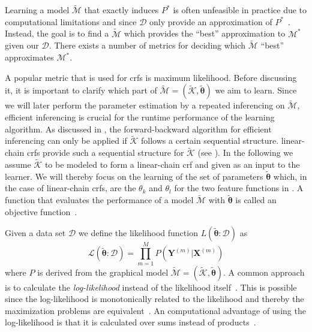 \bigskip

Learning a model $\mathcal{\tilde{M}}$ that exactly induces $P^*$ is often unfeasible in practice due to computational limitations and since $\mathcal{D}$ only provide an approximation of $P^*$~\citep{koller2009probabilistic}.
Instead, the goal is to find a $\mathcal{\tilde{M}}$ which provides the ``best'' approximation to $\mathcal{M}^*$ given our $\mathcal{D}$.
There exists a number of metrics for deciding which $\mathcal{\tilde{M}}$ ``best'' approximates $\mathcal{M}^*$.

A popular metric that is used for \glspl{crf} is \gls{maximum likelihood}.
Before discussing it, it is important to clarify which part of $\mathcal{\tilde{M}}=(\mathcal{\tilde{K}},\bm{\tilde{\theta}})$ we aim to learn.
Since we will later perform the parameter estimation by a repeated inferencing on $\mathcal{\tilde{M}}$, efficient inferencing is crucial for the runtime performance of the learning algorithm.
As discussed in , the forward-backward algorithm for efficient inferencing can only be applied if $\mathcal{\tilde{K}}$ follows a certain sequential structure.
\Glspl{linear-chain crf} provide such a sequential structure for $\mathcal{\tilde{K}}$ (see ).
In the following we assume $\mathcal{\tilde{K}}$ to be modeled to form a \gls{linear-chain crf} and given as an input to the learner.
We will thereby focus on the learning of the set of parameters $\bm{\tilde{\theta}}$ which, in the case of \glspl{linear-chain crf}, are the $\theta_k$ and $\theta_l$ for the two \glspl{feature function} in .
A function that evaluates the performance of a model $\mathcal{\tilde{M}}$ with $\bm{\tilde{\theta}}$ is called an \gls{objective function}~\citep{koller2009probabilistic}.

\bigskip
Given a data set $\mathcal{D}$ we define the likelihood function $L(\bm{\tilde{\theta}}:\mathcal{D})$ as
\begin{equation}
  \label{equ:likelihood}
  \mathcal{L}\left(\bm{\tilde{\theta}}:\mathcal{D}\right)=\prod_{m=1}^M P\left(\mathbf{Y}^{(m)}|\mathbf{X}^{(m)}\right)
\end{equation}
where $P$ is derived from the graphical model $\mathcal{\tilde{M}}=(\mathcal{\tilde{K}},\bm{\tilde{\theta}})$.
A common approach is to calculate the \textit{log-likelihood} instead of the likelihood itself~\citep{koller2009probabilistic,sutton2010introduction,mann2010generalized}.
This is possible since the log-likelihood is monotonically related to the likelihood and thereby the maximization problems are equivalent~\citep{koller2009probabilistic}.
An computational advantage of using the log-likelihood is that it is calculated over sums instead of products~\citep{koller2009probabilistic}.


